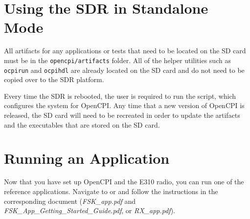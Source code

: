 \section{Using the SDR in Standalone Mode}
\begin{flushleft}
All artifacts for any applications or tests that need to be located on the SD card must be in the \texttt{opencpi/artifacts} folder.  All of the helper utilities such as \texttt{ocpirun} and \texttt{ocpihdl} are already located on the SD card and do not need to be copied over to the SDR platform. \bigskip

Every time the SDR is rebooted, the user is required to run the  script, which configures the system for OpenCPI. Any time that a new version of OpenCPI is released, the SD card will need to be recreated in order to update the artifacts and the executables that are stored on the SD card.
\end{flushleft}

\section{Running an Application}
Now that you have set up OpenCPI and the E310 radio, you can run one of the reference applications. Navigate to  or  and follow the instructions in the corresponding document (\textit{FSK\_app.pdf} and \textit{FSK\_App\_Getting\_Started\_Guide.pdf}, or \textit{RX\_app.pdf}).
\newpage


